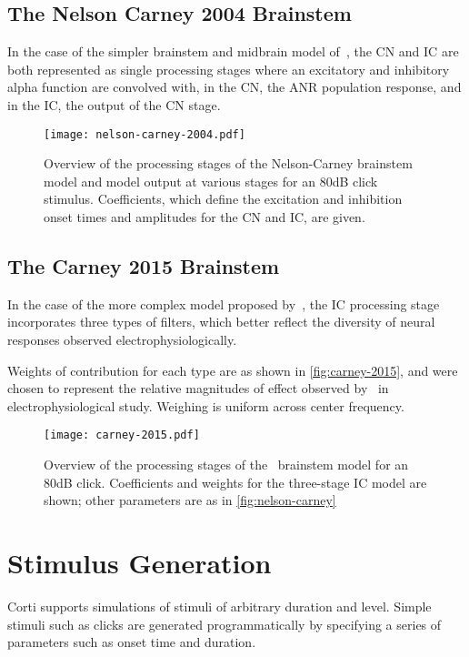 \subsection{The Nelson Carney 2004 Brainstem} %
In the case of the simpler brainstem and midbrain model of~\cite{Nelson2004Phenomenological}, the CN and IC are both represented as single processing stages where an excitatory and inhibitory alpha function are convolved with, in the CN, the ANR population response, and in the IC, the output of the CN stage. 
\label{sub:the_nelson_carney_2004_brainstem}
\begin{figure}[htbp]
	\centering
	\texttt{[image: nelson-carney-2004.pdf]}
	\caption[Overview of the Nelson-Carney Midbrain and Brainstem]{Overview of the processing stages of the Nelson-Carney brainstem model and model output at various stages for an 80dB click stimulus. Coefficients, which define the excitation and inhibition onset times and amplitudes for the CN and IC, are given. }
	\label{fig:nelson-carney}
\end{figure}
\subsection{The Carney 2015 Brainstem} %
\label{sub:the_carney_2015_brainstem}
In the case of the more complex model proposed by~\cite{Carney2015Speech}, the IC processing stage incorporates three types of filters, which better reflect the diversity of neural responses observed electrophysiologically. 

Weights of contribution for each type are as shown in \autoref{fig:carney-2015}, and were chosen to represent the relative magnitudes of effect observed by~\cite{Carney2015Speech} in electrophysiological study.  Weighing is uniform across center frequency.

\begin{figure}[htbp]
	\centering
	\texttt{[image: carney-2015.pdf]}
	\caption[Overview of the Carney Midbrain and Brainstem]{Overview of the processing stages of the~\cite{Carney2015Speech} brainstem model for an 80dB click.  Coefficients and weights for the three-stage IC model are shown; other parameters are as in \autoref{fig:nelson-carney}}
	\label{fig:carney-2015}
\end{figure}


\section{Stimulus Generation} %
\label{sec:stimulus_generation}
Corti supports simulations of stimuli of arbitrary duration and level.  Simple stimuli such as clicks are generated programmatically by specifying a series of parameters such as onset time and duration.  

